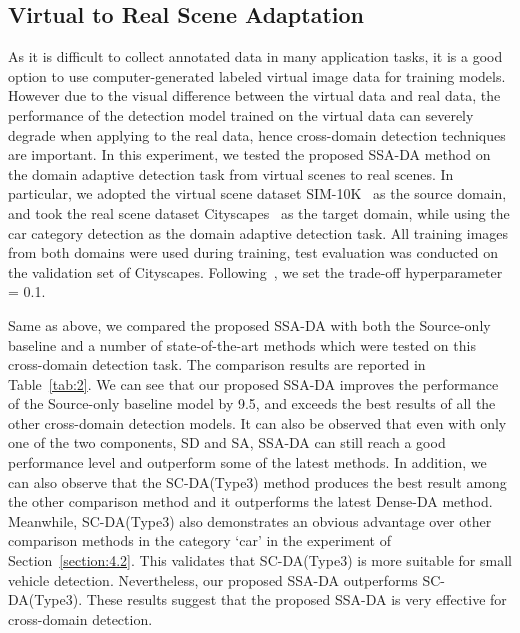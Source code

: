 \documentclass[runningheads]{llncs}
\begin{document}
\subsection{Virtual to Real Scene Adaptation}
As it is difficult to collect annotated data in many application tasks, 
it is a good option to use computer-generated labeled virtual image data for training models. 
However due to the visual difference between the virtual data and real data, 
the performance of the detection model trained on the virtual data can severely degrade when applying to the real data,
hence cross-domain detection techniques are important.
In this experiment, we tested the proposed SSA-DA method on the 
domain adaptive detection task from virtual scenes to real scenes. 
In particular, we adopted the virtual scene dataset SIM-10K~\cite{JohnsonDriving} as the source domain, 
and took the real scene dataset Cityscapes~\cite{cordts2016cityscapes} as the target domain, 
while using the car category detection as the domain adaptive detection task. 
All training images from both domains were used during training, 
test evaluation was conducted on the validation set of Cityscapes.
Following~\cite{chen2018domain},  
we set the trade-off hyperparameter  = 0.1. 

Same as above, we compared the proposed SSA-DA with both the Source-only baseline and a number of state-of-the-art methods
which were tested on this cross-domain detection task.
The comparison results are reported in Table~\ref{tab:2}. 
We can see that our proposed SSA-DA improves the performance of the Source-only baseline model by 9.5, 
and exceeds the best results of all the other cross-domain detection models. 
It can also be observed that 
even with only one of the two components, SD and SA, SSA-DA 
can still reach a good performance level and outperform some of the latest methods.
In addition, we can also observe 
that the SC-DA(Type3) method produces the best result among the other comparison method
and it outperforms the latest Dense-DA method. 
Meanwhile, 
SC-DA(Type3) also demonstrates an obvious advantage over other comparison methods in the category `car' in 
the experiment of Section~\ref{section:4.2}. 
This validates that SC-DA(Type3) 
is more suitable for small vehicle detection.  
Nevertheless, our proposed SSA-DA outperforms SC-DA(Type3).
These results suggest that the proposed SSA-DA is very effective for cross-domain detection.
\end{document}
